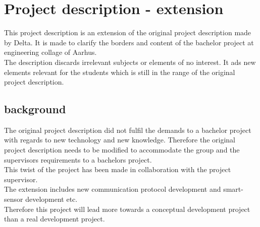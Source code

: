 \chapter{Project description - extension}
This project description is an extension of the original project description made by Delta. It is made to clarify the borders and content of the bachelor project at engineering collage of Aarhus.\\
The description discards irrelevant subjects or elements of no interest. It ads new elements relevant for the students which is still in the range of the original project description.


\section{background}
The original project description did not fulfil the demands to a bachelor project with regards to new technology and new knowledge. Therefore the original project description needs to be modified to accommodate the group and the supervisors requirements to a bachelors project. \\
This twist of the project has been made in collaboration with the project supervisor.\\
The extension includes new communication protocol development and smart-sensor development etc.\\
Therefore this project will lead more towards a conceptual development project than a real development project.\\



